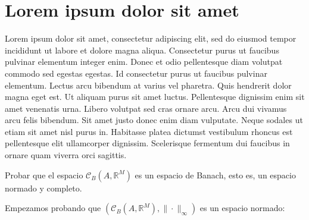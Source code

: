 \section{Lorem ipsum dolor sit amet}

Lorem ipsum dolor sit amet, consectetur adipiscing elit, sed do eiusmod tempor incididunt ut labore et dolore magna aliqua. Consectetur purus ut faucibus pulvinar elementum integer enim. Donec et odio pellentesque diam volutpat commodo sed egestas egestas. Id consectetur purus ut faucibus pulvinar elementum. Lectus arcu bibendum at varius vel pharetra. Quis hendrerit dolor magna eget est. Ut aliquam purus sit amet luctus. Pellentesque dignissim enim sit amet venenatis urna. Libero volutpat sed cras ornare arcu. Arcu dui vivamus arcu felis bibendum. Sit amet justo donec enim diam vulputate. Neque sodales ut etiam sit amet nisl purus in. Habitasse platea dictumst vestibulum rhoncus est pellentesque elit ullamcorper dignissim. Scelerisque fermentum dui faucibus in ornare quam viverra orci sagittis.

\begin{ejer} \label{acotadas_banach}
  Probar que el espacio $\mathcal{C}_B(A,\mathbb{R}^M)$ es un espacio de Banach, esto es, un espacio normado y completo.
\end{ejer}

  \begin{sol}
    Empezamos probando que $(\mathcal{C}_B(A, \mathbb R^M), \|\cdot \|_\infty)$ es un espacio normado:
  \end{sol}